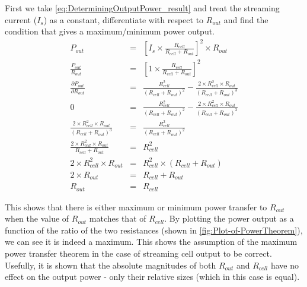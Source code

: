 First we take \cref{eq:DeterminingOutputPower_result} and treat the streaming current ($I_{s}$) as a constant, differentiate with respect to $R_{out}$ and find the condition that gives a maximum/minimum power output.
\begin{eqnarray}
    P_{out} & = & \left[I_{s}\times\frac{R_{cell}}{R_{cell}+R_{out}}\right]^{2}\times R_{out}\nonumber\\
    \frac{P_{out}}{R_{out}} & = & \left[1\times\frac{R_{cell}}{R_{cell}+R_{out}}\right]^{2}\nonumber\\
    \frac{\partial P_{out}}{\partial R_{out}} & = & \frac{R_{cell}^{2}}{(R_{cell}+R_{out})^{2}}-\frac{2\times R_{cell}^{2}\times R_{out}}{(R_{cell}+R_{out})^{3}}\nonumber\\
    0 & = & \frac{R_{cell}^{2}}{(R_{cell}+R_{out})^{2}}-\frac{2\times R_{cell}^{2}\times R_{out}}{(R_{cell}+R_{out})^{3}}\nonumber\\
    \frac{2\times R_{cell}^{2}\times R_{out}}{(R_{cell}+R_{out})^{3}} & = & \frac{R_{cell}^{2}}{(R_{cell}+R_{out})^{2}}\nonumber\\
    \frac{2\times R_{cell}^{2}\times R_{out}}{R_{cell}+R_{out}} & = & R_{cell}^{2}\nonumber\\
    2\times R_{cell}^{2}\times R_{out} & = & R_{cell}^{2}\times(R_{cell}+R_{out})\nonumber\\
    2\times R_{out} & = & R_{cell}+R_{out}\nonumber\\
    R_{out} & = & R_{cell}
    \label{eq:maximumPowerTheorem_norton}
\end{eqnarray}

This shows that there is either maximum or minimum power transfer to $R_{out}$ when the value of $R_{out}$ matches that of $R_{cell}$.
By plotting the power output as a function of the ratio of the two resistances (shown in \cref{fig:Plot-of-PowerTheorem}), we can see it is indeed a maximum.
This shows the assumption of the maximum power transfer theorem in the case of streaming cell output to be correct.
Usefully, it is shown that the absolute magnitudes of both $R_{out}$ and $R_{cell}$ have no effect on the output power - only their relative sizes (which in this case is equal).

